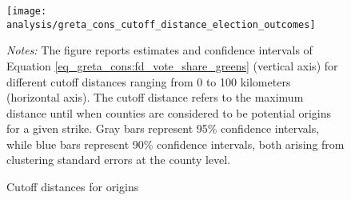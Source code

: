 \begin{figure}[H]\centering
	\caption{Cutoff distances for origins}\label{fig_greta_cons:origin_cutoff_distances}
	\texttt{[image: analysis/greta\_cons\_cutoff\_distance\_election\_outcomes]}
	\begin{minipage}{0.9\linewidth}
		\scriptsize{\emph{Notes:} The figure reports estimates and confidence intervals of Equation \ref{eq_greta_cons:fd_vote_share_greens} (vertical axis) for different cutoff distances ranging from 0 to 100 kilometers (horizontal axis). The cutoff distance refers to the maximum distance until when counties are considered to be potential origins for a given strike. Gray bars represent 95\% confidence intervals, while blue bars represent 90\% confidence intervals, both arising from clustering standard errors at the county level.}
	\end{minipage}
\end{figure}




